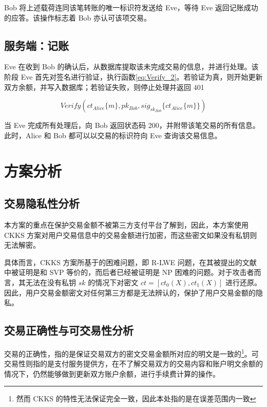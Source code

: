 Bob 将上述载荷连同该笔转账的唯一标识符发送给 Eve，等待 Eve 返回记账成功的应答。该操作标志着 Bob 亦认可该项交易。

\subsection{服务端：记账}

Eve 在收到 Bob 的确认后，从数据库提取该未完成交易的信息，并进行处理。该阶段 Eve 首先对签名进行验证，执行函数\eqref{eq:Verify_2}。若验证为真，则开始更新双方余额，并写入数据库；若验证失败，则停止处理并返回 401 

\begin{equation} \label{eq:Verify_2}
    Verify(ct_{Alice}\{m\}, pk_{Bob}, sig_{sk_{Bob}}\{ct_{Alice}\{m\}\})
\end{equation}

当 Eve 完成所有处理后，向 Bob 返回状态码 200，并附带该笔交易的所有信息。此时，Alice 和 Bob 都可以以交易的标识符向 Eve 查询该交易信息。

\section{方案分析}

\subsection{交易隐私性分析}

本方案的重点在保护交易金额不被第三方支付平台了解到，因此，本方案使用 CKKS 方案对用户交易信息中的交易金额进行加密，而这些密文如果没有私钥则无法解密。

具体而言，CKKS 方案所基于的困难问题，即 R-LWE 问题，在其被提出的文献\cite{cryptoeprint:2012/230}中被证明是和 SVP 等价的，而后者已经被证明是 NP 困难的问题\cite{10.1145/276698.276705}。对于攻击者而言，其无法在没有私钥 $sk$ 的情况下对密文 $ct = [ct_0(X), ct_1(X)]$ 进行还原。因此，用户交易金额密文对任何第三方都是无法辨认的，保护了用户交易金额的隐私。

\subsection{交易正确性与可交易性分析}

交易的正确性，指的是保证交易双方的密文交易金额所对应的明文是一致的\footnote{然而 CKKS 的特性无法保证完全一致，因此本处指的是在误差范围内一致}。可交易性则指的是支付服务提供方，在不了解交易双方的交易内容和账户明文余额的情况下，仍然能够做到更新双方账户余额，进行手续费计算的操作。


